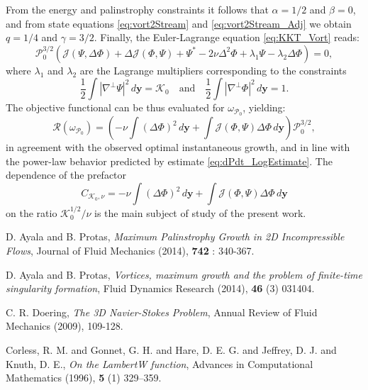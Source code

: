 \documentclass[11pt]{article}
\def\J{{\mathcal{J}}}
\def\P{{\mathcal{P}}}
\def\R{{\mathcal{R}}}
\def\K{{\mathcal{K}}}
\newcommand{\yvec}{\mathbf{y}}
\newcommand{\laplacian}{\Delta}
\newcommand{\nablaperp}{\nabla^{\perp}}
\begin{document}
From the energy and palinstrophy constraints it follows that $\alpha = 1/2$ and $\beta = 0$, and from state equations \eqref{eq:vort2Stream} and \eqref{eq:vort2Stream_Adj} we obtain $q = 1/4$ and $\gamma = 3/2$. Finally, the Euler-Lagrange equation \eqref{eq:KKT_Vort} reads:
\[
\P_0^{3/2} \left( \J(\Psi,\laplacian\Phi) + \laplacian\J(\Phi,\Psi) + \Psi^* - 
2\nu\laplacian^2\Phi + \lambda_1 \Psi - \lambda_2 \laplacian\Phi \right) = 0, 
\] 
where $\lambda_1$ and $\lambda_2$ are the Lagrange multipliers corresponding to the constraints 
\[
\frac{1}{2}\int | \nablaperp\Psi |^2 \, d\yvec = \K_0 \quad\mbox{and}\quad
\frac{1}{2}\int | \nablaperp\Phi |^2 \, d\yvec = 1.
\]
The objective functional can be thus evaluated for $\omega_{\P_0}$, yielding:
\[
\R(\omega_{\P_0}) = \left( -\nu \int \left( \laplacian\Phi\right)^2\,d\yvec + 
\int \J(\Phi,\Psi)\laplacian\Phi \,d\yvec \right)\P_0^{3/2},
\]
in agreement with the observed optimal instantaneous growth, and in line with the power-law behavior predicted by estimate \eqref{eq:dPdt_LogEstimate}. 
The dependence of the prefactor
\[
C_{\K_0,\nu} = -\nu \int \left( \laplacian\Phi\right)^2\,d\yvec + 
\int \J(\Phi,\Psi)\laplacian\Phi \,d\yvec 
\]
on the ratio $\K_0^{1/2}/\nu$ is the main subject of study of the present work.



\begin{thebibliography}{9}

 D. Ayala and B. Protas, \emph{Maximum Palinstrophy Growth in {2D} Incompressible Flows}, Journal of Fluid Mechanics (2014), \textbf{742} : 340-367.

 D. Ayala and B. Protas, \emph{Vortices, maximum growth and the problem of finite-time singularity formation}, Fluid Dynamics Research (2014), \textbf{46} (3) 031404.

 C. R. Doering, \emph{The {3D Navier-Stokes} Problem}, Annual Review of Fluid Mechanics (2009), 109-128.

 Corless, R. M. and Gonnet, G. H. and Hare, D. E. G. and Jeffrey, D. J. and Knuth, D. E., \emph{On the LambertW function}, Advances in Computational Mathematics (1996), \textbf{5} (1) 329--359.

\end{thebibliography}
\end{document}
